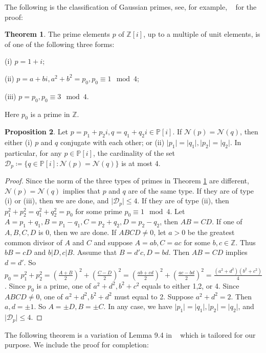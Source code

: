 \documentclass[12pt,amstex]{amsart}
\theoremstyle{definition}
\newtheorem{thm}{Theorem}[section]
\newtheorem{prop}[thm]{Proposition}
\def \Z {\mathbb{Z}[i]}
\def \P {\mathbb{P}[i]}
\begin{document}
The following is the classification of Gaussian primes, see, for example, ~\cite{GP} for the proof:
\begin{thm}\label{cls}
  The prime elements $p$ of $\Z$, up to a multiple of unit elements, is of one of the following three forms:

  (i) $p=1+i$;

  (ii) $p=a+bi, a^{2}+b^{2}=p_{0}, p_{0}\equiv 1 \mod 4$;

  (iii) $p=p_{0}, p_{0}\equiv 3 \mod 4$.

  Here $p_{0}$ is a prime in $\mathbb{Z}$.
\end{thm}
\begin{prop}\label{ne}
  Let $p=p_{1}+p_{2}i, q=q_{1}+q_{2}i\in\P$. If $\mathcal{N}(p)=\mathcal{N}(q)$, then either (i) $p$ and $q$ conjugate with each other; or (ii) $\vert p_{1}\vert=\vert q_{1}\vert, \vert p_{2}\vert=\vert q_{2}\vert$. In particular, for any $p\in\P$, the cardinality of the set $\mathcal{D}_{p}\coloneqq\{q\in\P\colon \mathcal{N}(p)=\mathcal{N}(q)\}$ is at most 4.
\end{prop}
\begin{proof}
  Since the norm of the three types of primes in Theorem \ref{cls} are different, $\mathcal{N}(p)=\mathcal{N}(q)$ implies that $p$ and $q$ are of the same type.
  If they are of type (i) or (iii), then we are done, and $\vert\mathcal{D}_{p}\vert\leq 4$. If they are of type (ii), then $p_{1}^{2}+p_{2}^{2}=q_{1}^{2}+q_{2}^{2}=p_{0}$ for some prime $p_{0}\equiv 1 \mod 4$. Let $A=p_{1}+q_{1}, B=p_{1}-q_{1}, C=p_{2}+q_{2}, D=p_{2}-q_{2}$, then $AB=CD$. If one of $A,B,C,D$ is 0, then we are done. If $ABCD\neq 0$, let $a>0$ be the greatest common divisor of $A$ and $C$ and suppose $A=ab, C=ac$ for some $b,c\in\mathbb{Z}$. Thus $bB=cD$ and $b|D, c|B$. Assume that $B=d'c, D=bd$. Then $AB=CD$ implies $d=d'$. So $p_{0}=p_{1}^{2}+p_{2}^{2}=(\frac{A+B}{2})^{2}+(\frac{C-D}{2})^{2}=(\frac{ab+cd}{2})^{2}+(\frac{ac-bd}{2})^{2}=\frac{(a^{2}+d^{2})(b^{2}+c^{2})}{4}$. Since $p_{0}$ is a prime, one of $a^{2}+d^{2}, b^{2}+c^{2}$ equals to either 1,2, or 4.
  Since $ABCD\neq 0$, one of $a^{2}+d^{2}, b^{2}+d^{2}$ must equal to 2. Suppose $a^{2}+d^{2}=2$. Then $a,d=\pm 1$. So $A=\pm D, B=\pm C$. In any case, we have $\vert p_{1}\vert=\vert q_{1}\vert, \vert p_{2}\vert=\vert q_{2}\vert$, and $\vert\mathcal{D}_{p}\vert\leq 4$.
\end{proof}

The following theorem is a variation of Lemma 9.4 in ~\cite{FH} which is tailored for our purpose. We include the proof for completion:
\end{document}
